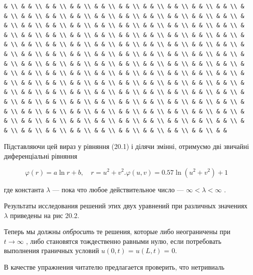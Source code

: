\documentclass[
  ukrainian,
]{article}
\begin{document}
\begin{verbatim}
& \\ & & \\ & & \\ & & \\ & & \\ & & \\ & & \\ & & \\ & & \\ & & \\ & & \\ & & \\ & & \\ & & \\ & & \\ & & \\ & & \\ & & \\ & & \\ & & \\ & & \\ & & \\ & & \\ & & \\ & & \\ & & \\ & & \\ & & \\ & & \\ & & \\ & & \\ & & \\ & & \\ & & \\ & & \\ & & \\ & & \\ & & \\ & & \\ & & \\ & & \\ & & \\ & & \\ & & \\ & & \\ & & \\ & & \\ & & \\ & & \\ & & \\ & & \\ & & \\ & & \\ & & \\ & & \\ & & \\ & & \\ & & \\ & & \\ & & \\ & & \\ & & \\ & & \\ & & \\ & & \\ & & \\ & & \\ & & \\ & & \\ & & \\ & & \\ & & \\ & & \\ & & \\ & & \\ & & \\ & & \\ & & \\ & & \\ & & \\ & & \\ & & \\ & & \\ & & \\ & & \\ & & \\ & & \\ & & \\ & & \\ & & \\ & & \\ & & \\ & & \\ & & \\ & & \\ & & \\ & & \\ & & \\ & & \\ & & \\ & & \\ & & \\ & & \\ & & \\ & & \\ & & \\ & & \\ & & \\ & & \\ & & \\ & & \\ & & \\ & & \\ & & \\ & & \\ & & \\ & & \\ & & \\ & & \\ & & \\ & & \\ & & \\ & & \\ & & \\ & & \\ & & \\ & & \\ & & \\ & & \\ & & \\ & & \\ & & \\ & & \\ & & \\ & & \\ & & \\ & & \\ & & \\ & & \\ & &
\end{verbatim}

Підставляючи цей вираз у рівняння (20.1) і ділячи змінні, отримуємо дві
звичайні диференціальні рівняння

\[
\varphi(r) = a \ln r + b, \quad r = u^2 + v^2.
\varphi(u, v) = 0.57 \ln(u^2 + v^2) + 1
\]

где константа \(\lambda\) --- пока что любое действительное число ---
\(\infty < \lambda < \infty\) .

Результаты исследования решений этих двух уравнений при различных
значениях \(\lambda\) приведены на рис 20.2.

Теперь мы должны \emph{опбросить} те решения, которые либо неограничены
при \(t \to \infty\) , либо становятся тождественно равными нулю, если
потребовать выполнения граничных условий \(u(0, t)\) = \(u(L, t)\) = 0.

В качестве упражнения читателю предлагается проверить, что нетривиаль
\end{document}
